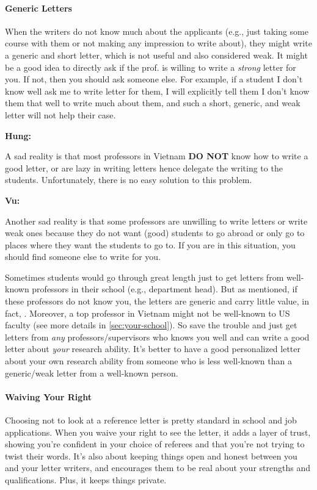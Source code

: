 \documentclass[oneside,11pt]{book}
\newenvironment{commentbox}[1][]{
  \small
  \begin{mybox}
    {\small \textbf{#1}}
  }{
  \end{mybox}
}
\newcommand{\red}[1]{{\color{red}{#1}}}
\begin{document}
\paragraph{Generic Letters} When the writers do not know much about the applicants (e.g., just taking some course with them or not making any impression to write about), they might write a generic and short letter, which is not useful and also considered weak.  It might be a good idea to directly ask if the prof. is willing to write a \emph{strong} letter for you. If not, then you should ask someone else.  For example, if a student I don't know well ask me to write letter for them, I will explicitly tell them I don't know them that well to write much about them, and such a short, generic, and weak letter will not help their case.

\begin{commentbox}[Hung:]
  A sad reality is that most professors in Vietnam \textbf{DO NOT} know how to write a good letter, or are lazy in writing letters hence delegate the writing to the students. Unfortunately, there is no easy solution to this problem.
\end{commentbox}

\begin{commentbox}[Vu:]

  Another sad reality is that some professors are unwilling to write letters or write weak ones because they do not want (good) students to go abroad or only go to places where they want the students to go to. If you are in this situation, you should find someone else to write for you.
  \tcblower

  Sometimes students would go through great length just to get letters from well-known professors in their school (e.g., department head). But as mentioned, if these professors do not know you, the letters are generic and carry little value, in fact, \red{red flags}. Moreover, a top professor in Vietnam might not be well-known to US faculty (see more details in \autoref{sec:your-school}). So save the trouble and just get letters from \emph{any} professors/supervisors who knows you well and can write a good letter about \emph{your} research ability. It's better to have a good personalized
  letter about your own research ability from someone who is less
  well-known than a generic/weak letter from a well-known person.
  
\end{commentbox}

\paragraph{Waiving Your Right}  Choosing not to look at a reference letter is pretty standard in school and job applications. When you waive your right to see the letter, it adds a layer of trust, showing you're confident in your choice of referees and that you're not trying to twist their words. It's also about keeping things open and honest between you and your letter writers, and encourages them to be real about your strengths and qualifications. Plus, it keeps things private.
\end{document}

